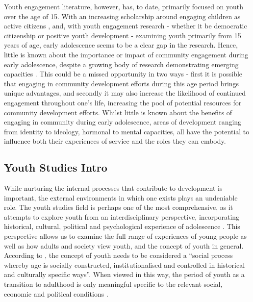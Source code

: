 Youth engagement literature, however, has, to date, primarily focused on youth over the age of 15. With an increasing scholarship around engaging children as active citizens \citep[see for example][]{Naughton2008,Jans2004,Golombek2006}, and, with youth engagement research - whether it be democratic citizenship or positive youth development - examining youth primarily from 15 years of age, early adolescence seems to be a clear gap in the research. Hence, little is known about the importance or impact of community engagement during early adolescence, despite a growing body of research demonstrating emerging capacities \citep[see for example][]{Pfeifer2012}. This could be a missed opportunity in two ways - first it is possible that engaging in community development efforts during this age period brings unique advantages, and secondly it may also increase the likelihood of continued engagement throughout one's life, increasing the pool of potential resources for community development efforts. Whilst little is known about the benefits of engaging in community during early adolescence, areas of development ranging from identity to ideology, hormonal to mental capacities, all have the potential to influence both their experiences of service and the roles they can embody. %


\subsection*{Youth Studies Intro} 

\label{IntroYouthStudies}
While nurturing the internal processes that contribute to development is important, the external environments in which one exists plays an undeniable role. The youth studies field is perhaps one of the most comprehensive, as it attempts to explore youth from an interdisciplinary perspective, incorporating historical, cultural, political and psychological experience of adolescence \citep{Furlong2013}. This perspective allows us to examine the full range of experiences of young people as well as how adults and society view youth, and the concept of youth in general. According to \citet[][p11]{Wyn1997}, the concept of youth needs to be considered a “social process whereby age is socially constructed, institutionalised and controlled in historical and culturally specific ways”. When viewed in this way, the period of youth as a transition to adulthood is only meaningful specific to the relevant social, economic and political conditions \citep[][p15]{Wyn1997}. 

